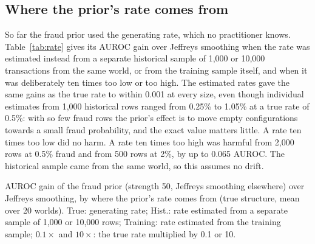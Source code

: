 \documentclass[final,5p,times,authoryear]{elsarticle}
\begin{document}
\subsection{Where the prior's rate comes from}\label{sec:rate}
So far the fraud prior used the generating rate, which no practitioner knows. Table~\ref{tab:rate} gives its AUROC gain over Jeffreys smoothing when the rate was estimated instead from a separate historical sample of 1,000 or 10,000 transactions from the same world, or from the training sample itself, and when it was deliberately ten times too low or too high. The estimated rates gave the same gains as the true rate to within 0.001 at every size, even though individual estimates from 1,000 historical rows ranged from 0.25\% to 1.05\% at a true rate of 0.5\%: with so few fraud rows the prior's effect is to move empty configurations towards a small fraud probability, and the exact value matters little. A rate ten times too low did no harm. A rate ten times too high was harmful from 2,000 rows at 0.5\% fraud and from 500 rows at 2\%, by up to 0.065 AUROC. The historical sample came from the same world, so this assumes no drift.

\begin{table}[H]
\centering\footnotesize
\begin{adjustbox}{max width=\linewidth}\end{adjustbox}
\caption{AUROC gain of the fraud prior (strength 50, Jeffreys smoothing elsewhere) over Jeffreys smoothing, by where the prior's rate comes from (true structure, mean over 20 worlds). True: generating rate; Hist.: rate estimated from a separate sample of 1,000 or 10,000 rows; Training: rate estimated from the training sample; $0.1\times$ and $10\times$: the true rate multiplied by 0.1 or 10.}\label{tab:rate}
\end{table}
\end{document}
